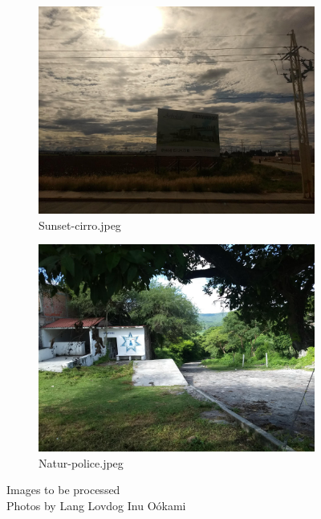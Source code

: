 \begin{figure}[!h]
\begin{subfigure}[b]{0.48\textwidth}
    \includegraphics[width=\textwidth]{res/Sunset-cirro.jpeg}
    \caption{Sunset-cirro.jpeg}  
  \end{subfigure}
  \begin{subfigure}[b]{0.48\textwidth}
    \centering
    \includegraphics[width=\textwidth]{res/Natur-police.jpeg}
    \caption{Natur-police.jpeg}
  \end{subfigure}

  \caption{Images to be processed\\\tiny{Photos by Lang Lovdog Inu Oókami}}
\end{figure}
